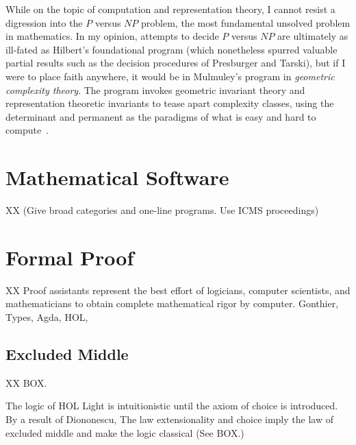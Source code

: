 \documentclass{llncs}
\begin{document}




While on the topic of computation and representation theory, I cannot
resist a digression into the $P$ versus $NP$ problem, the most
fundamental unsolved problem in mathematics. In my opinion, attempts
to decide $P$ versus $NP$ are ultimately as ill-fated as Hilbert's foundational
program (which nonetheless spurred valuable partial results such as
the decision procedures of Presburger and Tarski), but if I were to
place faith anywhere, it would be in Mulmuley's program in {\it
  geometric complexity theory}.  The program invokes geometric
invariant theory and representation theoretic invariants to tease
apart complexity classes, using the determinant and permanent as the
paradigms of what is easy and hard to compute~\cite{Mul11}.





\section{Mathematical Software}

XX (Give broad categories and one-line programs. Use ICMS proceedings)


\section{Formal Proof}

XX Proof assistants represent the best effort of logicians, computer
scientists, and mathematicians to obtain complete mathematical rigor
by computer.  Gonthier, Types, Agda, HOL,


\subsection{Excluded Middle}

XX BOX.

The logic of HOL Light is intuitionistic until the axiom of choice is
introduced.  By a result of Diononescu, The law extensionality and
choice imply the law of excluded middle and make the logic classical
(See BOX.) \cite{Bee85}
\end{document}
